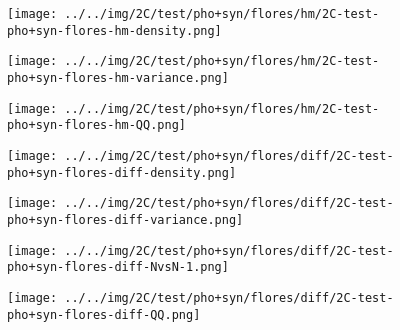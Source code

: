 \begin{figure}[H]
\centering	\texttt{[image: ../../img/2C/test/pho+syn/flores/hm/2C-test-pho+syn-flores-hm-density.png]}
\end{figure}
\begin{figure}[H]
\centering	\texttt{[image: ../../img/2C/test/pho+syn/flores/hm/2C-test-pho+syn-flores-hm-variance.png]}
\end{figure}
\begin{figure}[H]
\centering	\texttt{[image: ../../img/2C/test/pho+syn/flores/hm/2C-test-pho+syn-flores-hm-QQ.png]}
\end{figure}
\begin{figure}[H]
\centering	\texttt{[image: ../../img/2C/test/pho+syn/flores/diff/2C-test-pho+syn-flores-diff-density.png]}
\end{figure}
\begin{figure}[H]
\centering	\texttt{[image: ../../img/2C/test/pho+syn/flores/diff/2C-test-pho+syn-flores-diff-variance.png]}
\end{figure}
\begin{figure}[H]
\centering	\texttt{[image: ../../img/2C/test/pho+syn/flores/diff/2C-test-pho+syn-flores-diff-NvsN-1.png]}
\end{figure}
\begin{figure}[H]
\centering	\texttt{[image: ../../img/2C/test/pho+syn/flores/diff/2C-test-pho+syn-flores-diff-QQ.png]}
\end{figure}
